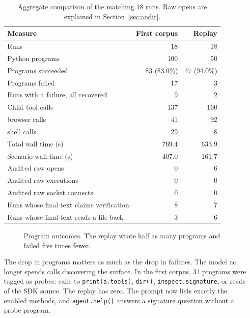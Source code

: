 \documentclass[11pt]{article}
\newcommand{\code}[1]{\texttt{#1}}
\begin{document}
\begin{table}[h]
\centering
\small
\begin{tabular}{@{}lrr@{}}
\toprule
Measure & First corpus & Replay \\
\midrule
Runs & 18 & 18 \\
Python programs & 100 & 50 \\
Programs succeeded & 83 (83.0\%) & 47 (94.0\%) \\
Programs failed & 17 & 3 \\
Runs with a failure, all recovered & 9 & 2 \\
Child tool calls & 137 & 160 \\
\quad browser calls & 41 & 92 \\
\quad shell calls & 29 & 8 \\
Total wall time (s) & 769.4 & 633.9 \\
Scenario wall time (s) & 407.0 & 161.7 \\
Audited raw opens & 0 & 6 \\
Audited raw executions & 0 & 0 \\
Audited raw socket connects & 0 & 0 \\
Runs whose final text claims verification & 8 & 7 \\
Runs whose final text reads a file back & 3 & 6 \\
\bottomrule
\end{tabular}
\caption{Aggregate comparison of the matching 18 runs. Raw opens are explained
in Section~\ref{sec:audit}.}
\end{table}

\begin{figure}[h]
\centering
{}
\caption{Program outcomes. The replay wrote half as many programs and failed
five times fewer.}
\end{figure}

The drop in programs matters as much as the drop in failures. The model no
longer spends calls discovering the surface. In the first corpus, 31 programs
were tagged as probes: calls to \code{print(a.tools)}, \code{dir()},
\code{inspect.signature}, or reads of the SDK source. The replay has zero. The
prompt now lists exactly the enabled methods, and \code{agent.help()} answers a
signature question without a probe program.
\end{document}
